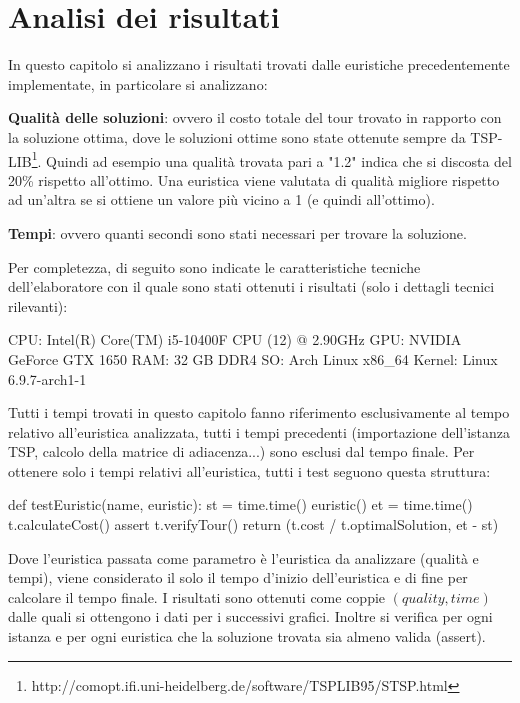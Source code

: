 \documentclass[a4paper,12pt]{report}
\begin{document}
\chapter{Analisi dei risultati}
In questo capitolo si analizzano i risultati trovati dalle euristiche precedentemente implementate, in particolare si analizzano:
\begin{legal}
  \item {\bf Qualità delle soluzioni}: ovvero il costo totale del tour trovato in rapporto con la soluzione ottima, dove le soluzioni ottime sono state ottenute sempre da TSP-LIB\footnote{http://comopt.ifi.uni-heidelberg.de/software/TSPLIB95/STSP.html}. Quindi ad esempio una qualità trovata pari a "1.2" indica che si discosta del 20\% rispetto all'ottimo. Una euristica viene valutata di qualità migliore rispetto ad un'altra se si ottiene un valore più vicino a 1 (e quindi all'ottimo).
  \item {\bf Tempi}: ovvero quanti secondi sono stati necessari per trovare la soluzione.
\end{legal}
Per completezza, di seguito sono indicate le caratteristiche tecniche dell'elaboratore con il quale sono stati ottenuti i risultati (solo i dettagli tecnici rilevanti):
\begin{myverbatim}
CPU:    Intel(R) Core(TM) i5-10400F CPU (12) @ 2.90GHz
GPU:    NVIDIA GeForce GTX 1650
RAM:    32 GB DDR4
SO:     Arch Linux x86_64
Kernel: Linux 6.9.7-arch1-1
\end{myverbatim}
Tutti i tempi trovati in questo capitolo fanno riferimento esclusivamente al tempo relativo all'euristica analizzata, tutti i tempi precedenti (importazione dell'istanza TSP, calcolo della matrice di adiacenza...) sono esclusi dal tempo finale. Per ottenere solo i tempi relativi all'euristica, tutti i test seguono questa struttura:
\begin{python}
def testEuristic(name, euristic):
  st = time.time()
  euristic()
  et = time.time()
  t.calculateCost()
  assert t.verifyTour()
  return (t.cost / t.optimalSolution, et - st)
\end{python}
Dove l'euristica passata come parametro è l'euristica da analizzare (qualità e tempi), viene considerato il solo il tempo d'inizio dell'euristica e di fine per calcolare il tempo finale. I risultati sono ottenuti come coppie $(quality, time)$ dalle quali si ottengono i dati per i successivi grafici. Inoltre si verifica per ogni istanza e per ogni euristica che la soluzione trovata sia almeno valida (assert).
\end{document}
